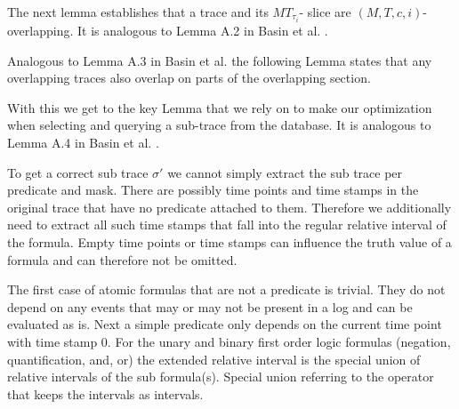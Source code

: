 The next lemma establishes that a trace and its $MT_{\tau_i}$- slice are $(M,T,c,i)$- overlapping.
It is analogous to Lemma A.2 in Basin et al. \cite{Basin2016}.



Analogous to Lemma A.3 in Basin et al. \cite{Basin2016} the following Lemma states that any overlapping traces also overlap on parts of the overlapping section.


With this we get to the key Lemma that we rely on to make our optimization when selecting and querying a sub-trace from the database.
It is analogous to Lemma A.4 in Basin et al. \cite{Basin2016}.




To get a correct sub trace $\sigma'$ we cannot simply extract the sub trace per predicate and mask.
There are possibly time points and time stamps in the original trace that have no predicate attached to them.
Therefore we additionally need to extract all such time stamps that fall into the regular relative interval of the formula.
Empty time points or time stamps can influence the truth value of a formula and can therefore not be omitted.

The first case of atomic formulas that are not a predicate is trivial.
They do not depend on any events that may or may not be present in a log and can be evaluated as is.
Next a simple predicate only depends on the current time point with time stamp $0$.
For the unary and binary first order logic formulas (negation, quantification, and, or) the extended relative interval is the special union of relative intervals of the sub formula(s).
Special union referring to the operator that keeps the intervals as intervals.